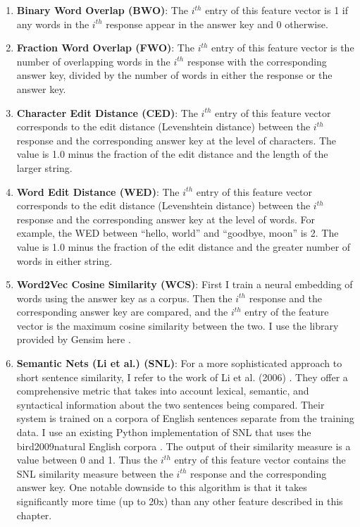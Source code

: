 \begin{enumerate}
\item \textbf{Binary Word Overlap (BWO)}: The $i^{th}$ entry of this feature vector is 1 if any words in the $i^{th}$ response appear in the answer key and 0 otherwise.
\item \textbf{Fraction Word Overlap (FWO)}: The $i^{th}$ entry of this feature vector is the number of overlapping words in the $i^{th}$ response with the corresponding answer key, divided by the number of words in either the response or the answer key.  
\item \textbf{Character Edit Distance (CED)}: The $i^{th}$ entry of this feature vector corresponds to the edit distance (Levenshtein distance) between the $i^{th}$ response and the corresponding answer key at the level of characters. The value is 1.0 minus the fraction of the edit distance and the length of the larger string.
\item \textbf{Word Edit Distance (WED)}:  The $i^{th}$ entry of this feature vector corresponds to the edit distance (Levenshtein distance) between the $i^{th}$ response and the corresponding answer key at the level of words. For example, the WED between ``hello, world'' and ``goodbye, moon'' is 2. The value is 1.0 minus the fraction of the edit distance and the greater number of words in either string.
\item \textbf{Word2Vec Cosine Similarity (WCS)}: First I train a neural embedding of words using the answer key as a corpus. Then the $i^{th}$ response and the corresponding answer key are compared, and the $i^{th}$ entry of the feature vector is the maximum cosine similarity between the two. I use the library provided by Gensim here  \citep{sojka2010software}.
\item \textbf{Semantic Nets (Li et al.) (SNL)}: For a more sophisticated approach to short sentence similarity, I refer to the work of Li et al. (2006)  \citep{li2006sentence}. They offer a comprehensive metric that takes into account lexical, semantic, and syntactical information about the two sentences being compared. Their system is trained on a corpora of English sentences separate from the training data. I use an existing Python implementation of SNL that uses the bird2009natural English corpora  \citep{bird2009natural}. The output of their similarity measure is a value between 0 and 1. Thus the $i^{th}$ entry of this feature vector contains the SNL similarity measure between the $i^{th}$ response and the corresponding answer key. One notable downside to this algorithm is that it takes significantly more time (up to 20x) than any other feature described in this chapter.
\end{enumerate}

